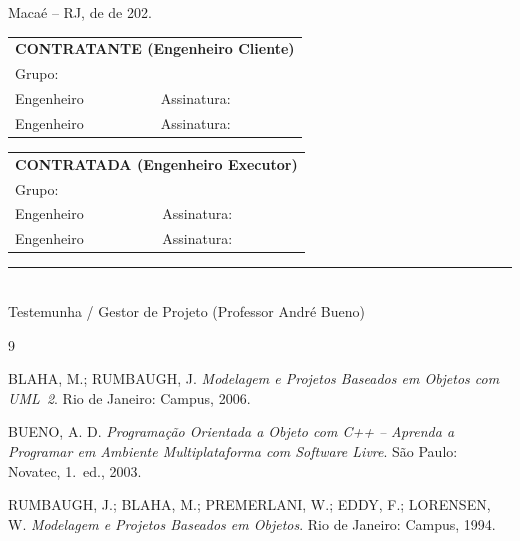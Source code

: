\documentclass[12pt,a4paper]{article}
\begin{document}
\vspace{1cm}
Macaé -- RJ, \underline{\hspace{1cm}} de \underline{\hspace{3cm}} de 202\underline{\hspace{0.5cm}}.

\vspace{2cm}
\noindent
\begin{tabular}{p{}p{}}
\hline
\multicolumn{2}{l}{\textbf{CONTRATANTE (Engenheiro Cliente)}}\\[0.2cm]
\multicolumn{2}{l}{Grupo:}\\[1cm]
Engenheiro \underline{\hspace{3cm}} & Assinatura: \underline{\hspace{3cm}} \\[1cm]
Engenheiro \underline{\hspace{3cm}} & Assinatura: \underline{\hspace{3cm}} \\
\end{tabular}

\vspace{1.5cm}
\noindent
\begin{tabular}{p{}p{}}
\hline
\multicolumn{2}{l}{\textbf{CONTRATADA (Engenheiro Executor)}}\\[0.2cm]
\multicolumn{2}{l}{Grupo:}\\[1cm]
Engenheiro \underline{\hspace{3cm}} & Assinatura: \underline{\hspace{3cm}} \\[1cm]
Engenheiro \underline{\hspace{3cm}} & Assinatura: \underline{\hspace{3cm}} \\
\end{tabular}

\vspace{1.5cm}
\noindent\rule{0.6\textwidth}{0.4pt}\\
Testemunha / Gestor de Projeto (Professor André Bueno)

\newpage
\begin{thebibliography}{9}

BLAHA, M.; RUMBAUGH, J.
\textit{Modelagem e Projetos Baseados em Objetos com UML~2}.
Rio de Janeiro: Campus, 2006.

BUENO, A. D.
\textit{Programação Orientada a Objeto com C++ -- Aprenda a Programar em Ambiente Multiplataforma com Software Livre}.
São Paulo: Novatec, 1.~ed., 2003.

RUMBAUGH, J.; BLAHA, M.; PREMERLANI, W.; EDDY, F.; LORENSEN, W.
\textit{Modelagem e Projetos Baseados em Objetos}.
Rio de Janeiro: Campus, 1994.

\end{thebibliography}
\end{document}

